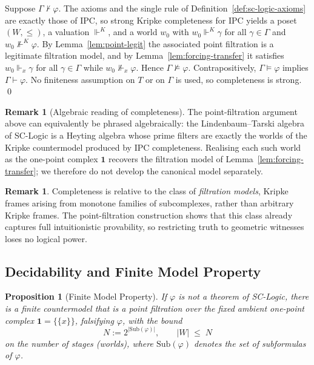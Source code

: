 \documentclass[final,12pt]{elsarticle}
\theoremstyle{plain}
\newtheorem{prop}[thm]{Proposition}
\theoremstyle{definition}
\newtheorem{rem}[thm]{Remark}
\begin{document}
Suppose \(\Gamma \nvdash \varphi\). The axioms and the single rule of
Definition~\ref{def:sc-logic-axioms} are exactly those of IPC, so strong
Kripke completeness for IPC \cite{kripke1965} yields a poset
\((W,\le)\), a valuation \(\Vdash^{K}\), and a world \(w_0\) with
\(w_0 \Vdash^{K} \gamma\) for all \(\gamma \in \Gamma\) and
\(w_0 \nVdash^{K} \varphi\). By Lemma~\ref{lem:point-legit} the associated point
filtration is a legitimate filtration model, and by
Lemma~\ref{lem:forcing-transfer} it satisfies \(w_0 \Vdash_x \gamma\) for all
\(\gamma \in \Gamma\) while \(w_0 \nVdash_x \varphi\). Hence
\(\Gamma \nvDash \varphi\). Contrapositively, \(\Gamma \vDash \varphi\) implies
\(\Gamma \vdash \varphi\). No finiteness assumption on \(T\) or on \(\Gamma\) is
used, so completeness is strong.
\qed
\begin{rem}[Algebraic reading of completeness]
The point-filtration argument above can equivalently be phrased algebraically: the
Lindenbaum--Tarski algebra of SC-Logic is a Heyting algebra whose prime filters are
exactly the worlds of the Kripke countermodel produced by IPC completeness.
Realising each such world as the one-point complex \(\mathbf 1\) recovers the
filtration model of Lemma~\ref{lem:forcing-transfer}; we therefore do not develop
the canonical model separately.
\end{rem}

\begin{rem}
Completeness is relative to the class of \emph{filtration models}, Kripke frames
arising from monotone families of subcomplexes, rather than arbitrary Kripke
frames. The point-filtration construction shows that this class already captures
full intuitionistic provability, so restricting truth to geometric witnesses
loses no logical power.
\end{rem}


\subsection{Decidability and Finite Model Property}
\label{subsec:fmp}

\begin{prop}[Finite Model Property]
\label{prop:fmp}
If \(\varphi\) is not a theorem of SC-Logic, there is a finite countermodel that is
a point filtration over the fixed ambient one-point complex
\(\mathbf 1=\{\{x\}\}\), falsifying \(\varphi\), with the bound
\[
  N:=2^{|\mathrm{Sub}(\varphi)|},\qquad |W| \;\le\; N
\]
on the number of stages (worlds), where \(\mathrm{Sub}(\varphi)\) denotes the set
of subformulas of \(\varphi\).
\end{prop}
\end{document}
